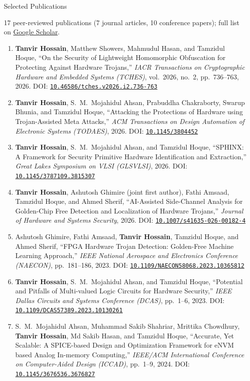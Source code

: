 \begin{rSection}{Selected Publications}
\newcommand{\doi}[1]{DOI: \href{https://doi.org/#1}{\nolinkurl{#1}}}

17 peer-reviewed publications (7 journal articles, 10 conference papers); full list on \href{https://scholar.google.com/citations?user=lPEOU2wAAAAJ&hl=en}{Google Scholar}.

\begin{enumerate}[itemsep=-0.15em, leftmargin=1.5em]
    \item \textbf{Tanvir Hossain}, Matthew Showers, Mahmudul Hasan, and Tamzidul Hoque, ``On the Security of Lightweight Homomorphic Obfuscation for Protecting Against Hardware Trojans,'' \emph{IACR Transactions on Cryptographic Hardware and Embedded Systems (TCHES)}, vol.\ 2026, no.\ 2, pp.\ 736--763, 2026. \doi{10.46586/tches.v2026.i2.736-763}

    \item \textbf{Tanvir Hossain}, S.\ M.\ Mojahidul Ahsan, Prabuddha Chakraborty, Swarup Bhunia, and Tamzidul Hoque, ``Attacking the Protections of Hardware using Trojan-Assisted Meta Attacks,'' \emph{ACM Transactions on Design Automation of Electronic Systems (TODAES)}, 2026. \doi{10.1145/3804452}

    \item \textbf{Tanvir Hossain}, S.\ M.\ Mojahidul Ahsan, and Tamzidul Hoque, ``SPHINX: A Framework for Security Primitive Hardware Identification and Extraction,'' \emph{Great Lakes Symposium on VLSI (GLSVLSI)}, 2026. \doi{10.1145/3787109.3815307}

    \item \textbf{Tanvir Hossain}, Ashutosh Ghimire (joint first author), Fathi Amsaad, Tamzidul Hoque, and Ahmed Sherif, ``AI-Assisted Side-Channel Analysis for Golden-Chip Free Detection and Localization of Hardware Trojans,'' \emph{Journal of Hardware and Systems Security}, 2026. \doi{10.1007/s41635-026-00182-4}

    \item Ashutosh Ghimire, Fathi Amsaad, \textbf{Tanvir Hossain}, Tamzidul Hoque, and Ahmed Sherif, ``FPGA Hardware Trojan Detection: Golden-Free Machine Learning Approach,'' \emph{IEEE National Aerospace and Electronics Conference (NAECON)}, pp.\ 181--186, 2023. \doi{10.1109/NAECON58068.2023.10365812}

    \item \textbf{Tanvir Hossain}, S.\ M.\ Mojahidul Ahsan, and Tamzidul Hoque, ``Potential and Pitfalls of Multi-valued Logic Circuits for Hardware Security,'' \emph{IEEE Dallas Circuits and Systems Conference (DCAS)}, pp.\ 1--6, 2023. \doi{10.1109/DCAS57389.2023.10130261}

    \item S.\ M.\ Mojahidul Ahsan, Muhammad Sakib Shahriar, Mrittika Chowdhury, \textbf{Tanvir Hossain}, Md Sakib Hasan, and Tamzidul Hoque, ``Accurate, Yet Scalable: A SPICE-based Design and Optimization Framework for eNVM based Analog In-memory Computing,'' \emph{IEEE/ACM International Conference on Computer-Aided Design (ICCAD)}, pp.\ 1--9, 2024. \doi{10.1145/3676536.3676827}
\end{enumerate}

\end{rSection}
